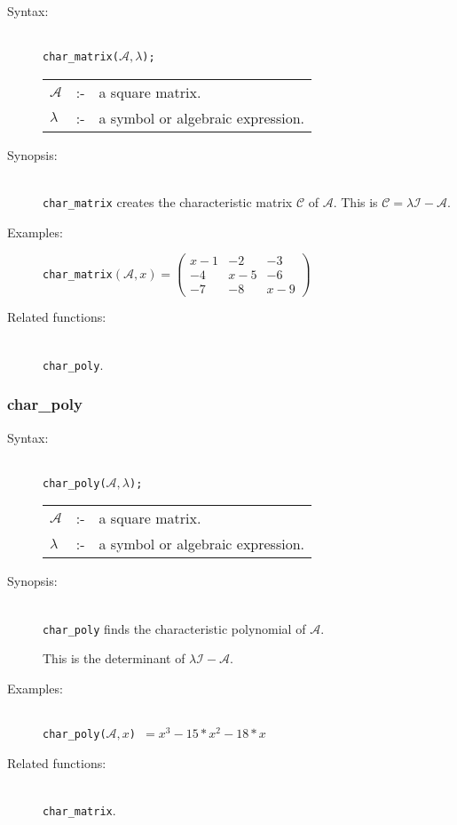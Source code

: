 \begin{description}
\item[Syntax:]\mbox{}\\
\texttt{char\_matrix($\mathcal{A},\lambda$);}\\[2mm]
\begin{tabular}{l l l}
$\mathcal{A}$ &:-& a square matrix. \\
$\lambda$  &:-& a symbol or algebraic expression.
\end{tabular}

\item[Synopsis:]\mbox{}\\
\texttt{char\_matrix} creates the characteristic matrix $\mathcal{C}$ of
$\mathcal{A}$.  This is $\mathcal{C} = \lambda \mathcal{I} - \mathcal{A}$.

\item[Examples:]
\begin{flushleft}
\texttt{char\_matrix}\((\mathcal{A},x) =
\begin{pmatrix} x-1 & -2 & -3 \\ -4 & x-5 & -6 \\ -7 & -8 & x-9 \end{pmatrix}\)
\end{flushleft}

\item[Related functions:]\mbox{}\\
\texttt{char\_poly}.
\end{description}


\subsubsection{char\_poly}
\label{linalg:char_poly}

\begin{description}
\item[Syntax:]\mbox{}\\
\texttt{char\_poly($\mathcal{A},\lambda$);}\\[2mm]
\begin{tabular}{l l l}
$\mathcal{A}$ &:-& a square matrix. \\
$\lambda$ &:-& a symbol or algebraic expression.
\end{tabular}

\item[Synopsis:]\mbox{}\\
\texttt{char\_poly} finds the characteristic polynomial of
                $\mathcal{A}$.

This is the determinant of $\lambda \mathcal{I} - \mathcal{A}$.

\item[Examples:]\mbox{}\\
\texttt{char\_poly($\mathcal{A},x$) $= x^3-15*x^2-18*x$}

\item[Related functions:]\mbox{}\\
 \texttt{char\_matrix}.
\end{description}


